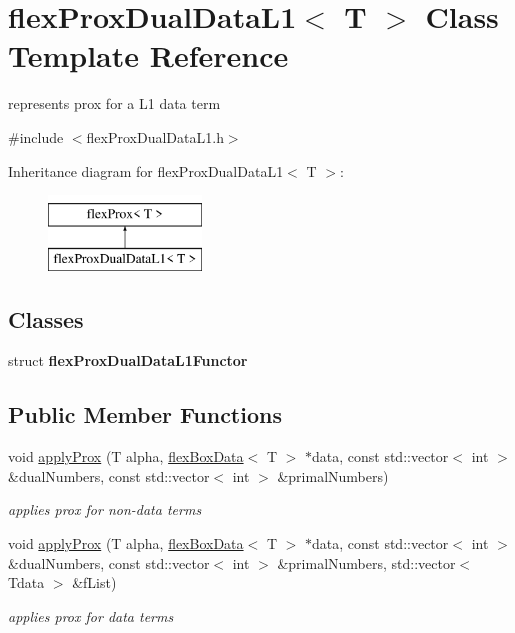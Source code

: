 \hypertarget{classflex_prox_dual_data_l1}{}\section{flex\+Prox\+Dual\+Data\+L1$<$ T $>$ Class Template Reference}
\label{classflex_prox_dual_data_l1}


represents prox for a L1 data term  




{\ttfamily \#include $<$flex\+Prox\+Dual\+Data\+L1.\+h$>$}

Inheritance diagram for flex\+Prox\+Dual\+Data\+L1$<$ T $>$\+:\begin{figure}[H]
\begin{center}
\leavevmode
\includegraphics[height=2.000000cm]{classflex_prox_dual_data_l1}
\end{center}
\end{figure}
\subsection*{Classes}
\begin{DoxyCompactItemize}
\item 
struct {\bfseries flex\+Prox\+Dual\+Data\+L1\+Functor}
\end{DoxyCompactItemize}
\subsection*{Public Member Functions}
\begin{DoxyCompactItemize}
\item 
void \hyperlink{classflex_prox_dual_data_l1_a8ebb08fae14a70bc6ed15b6d75b67705}{apply\+Prox} (T alpha, \hyperlink{classflex_box_data}{flex\+Box\+Data}$<$ T $>$ $\ast$data, const std\+::vector$<$ int $>$ \&dual\+Numbers, const std\+::vector$<$ int $>$ \&primal\+Numbers)
\begin{DoxyCompactList}\small\item\em applies prox for non-\/data terms \end{DoxyCompactList}\item 
void \hyperlink{classflex_prox_dual_data_l1_a3487ee84a12852486a1639d3b9dea735}{apply\+Prox} (T alpha, \hyperlink{classflex_box_data}{flex\+Box\+Data}$<$ T $>$ $\ast$data, const std\+::vector$<$ int $>$ \&dual\+Numbers, const std\+::vector$<$ int $>$ \&primal\+Numbers, std\+::vector$<$ Tdata $>$ \&f\+List)
\begin{DoxyCompactList}\small\item\em applies prox for data terms \end{DoxyCompactList}\end{DoxyCompactItemize}
